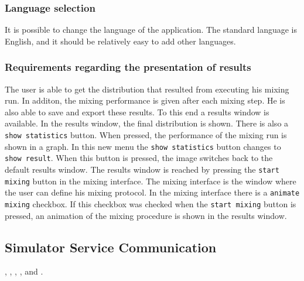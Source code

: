 \subsubsection{Language selection}
It is possible to change the language of the application. The standard language is English, and it should be relatively easy to add other languages.

\subsubsection{Requirements regarding the presentation of results}
The user is able to get the distribution that resulted from executing his mixing run. In additon, the mixing performance is given after each mixing step. He is also able to save and export these results. To this end a results window is available. In the results window, the final distribution is shown. There is also a \texttt{show statistics} button. When pressed, the performance of the mixing run is shown in a graph. In this new menu the \texttt{show statistics} button changes to \texttt{show result}. When this button is pressed, the image switches back to the default results window. The results window is reached by pressing the \texttt{start mixing} button in the mixing interface. The mixing interface is the window where the user can define his mixing protocol. In the mixing interface there is a \texttt{animate mixing} checkbox. If this checkbox was checked when the \texttt{start mixing} button is pressed, an animation of the mixing procedure is shown in the results window.



\subsection[SSC]{Simulator Service Communication}, , , ,  and .

